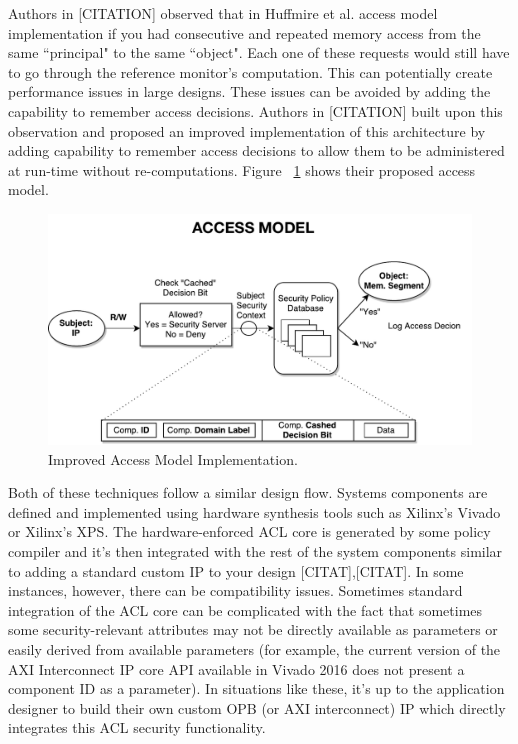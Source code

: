 \documentclass[sigconf]{acmart}
\theoremstyle{plain}
\theoremstyle{remark}
\begin{document}
Authors in [CITATION] observed that in Huffmire et al. access model implementation if you had consecutive and repeated memory access from the same ``principal" to the same ``object". Each one of these requests would still have to go through the reference monitor's computation. This can potentially create performance issues in large designs. These issues can be avoided by adding the capability to remember access decisions. Authors in [CITATION] built upon this observation and proposed an improved implementation of this architecture by adding capability to remember access decisions to allow them to be administered at run-time without re-computations. Figure ~\ref{fig:access} shows their proposed access model. 

\begin{figure}[hbt]
\centering 
\includegraphics[width=1\columnwidth]{figures/access.pdf} 
\caption{Improved Access Model Implementation.} %
\label{fig:access} 
\end{figure}

Both of these techniques follow a similar design flow. Systems components are defined and implemented using hardware synthesis tools such as Xilinx's Vivado or Xilinx's XPS.  The hardware-enforced ACL core is generated by some policy compiler and it's then integrated with the rest of the system components similar to adding a standard custom IP to your design [CITAT],[CITAT]. In some instances, however, there can be compatibility issues. Sometimes standard integration of the ACL core can be complicated with the fact that sometimes some security-relevant attributes may not be directly available as parameters or easily derived from available parameters (for example, the current version of the AXI Interconnect IP core API available in Vivado 2016 does not present a component ID as a parameter). In situations like these, it's up to the application designer to build their own custom OPB (or AXI interconnect) IP which directly integrates this ACL security functionality. 
\end{document}
